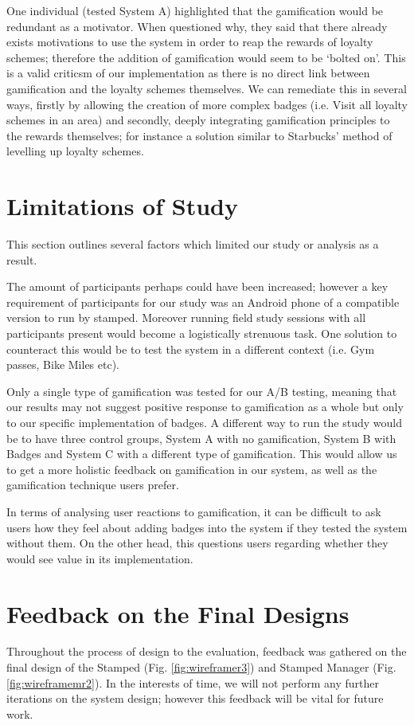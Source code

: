 One individual (tested System A) highlighted that the gamification would be redundant as a motivator. When questioned why, they said that there already exists motivations to use the system in order to reap the rewards of loyalty schemes; therefore the addition of gamification would seem to be `bolted on'. This is a valid criticsm of our implementation as there is no direct link between gamification and the loyalty schemes themselves. We can remediate this in several ways, firstly by allowing the creation of more complex badges (i.e. Visit all loyalty schemes in an area) and secondly, deeply integrating gamification principles to the rewards themselves; for instance a solution similar to Starbucks' method of levelling up loyalty schemes.

\section{Limitations of Study}
This section outlines several factors which limited our study or analysis as a result.

The amount of participants perhaps could have been increased; however a key requirement of participants for our study was an Android phone of a compatible version to run by stamped. Moreover running field study sessions with all participants present would become a logistically strenuous task. One solution to counteract this would be to test the system in a different context (i.e. Gym passes, Bike Miles etc).
   
Only a single type of gamification was tested for our A/B testing, meaning that our results may not suggest positive response to gamification as a whole but only to our specific implementation of badges.  A different way to run the study would be to have three control groups, System A with no gamification, System B with Badges and System C with a different type of gamification. This would allow us to get a more holistic feedback on gamification in our system, as well as the gamification technique users prefer. 

In terms of analysing user reactions to gamification, it can be difficult to ask users how they feel about adding badges into the system if they tested the system without them. On the other head, this questions users regarding whether they would see value in its implementation. %

\section{Feedback on the Final Designs}
Throughout the process of design to the evaluation, feedback was gathered on the final design of the Stamped (Fig. \ref{fig:wireframer3}) and Stamped Manager (Fig. \ref{fig:wireframemr2}). In the interests of time, we will not perform any further iterations on the system design; however this feedback will be vital for future work.
